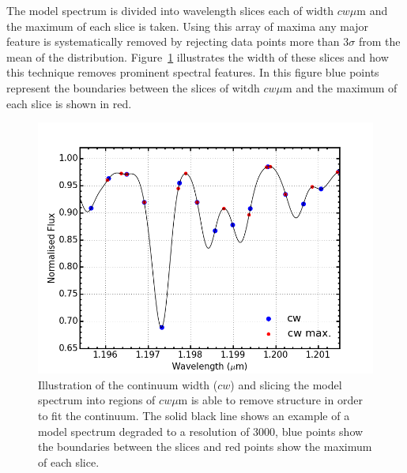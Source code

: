 \documentclass[12pt]{article}
\begin{document}

The model spectrum is divided into wavelength slices each of width $cw\mu$m and the maximum of each slice is taken.
Using this array of maxima any major feature is systematically removed by rejecting data points more than 3$\sigma$ from the mean of the distribution.
Figure~\ref{fig:cw} illustrates the width of these slices and how this technique  removes prominent spectral features.
In this figure blue points represent the boundaries between the slices of witdh $cw\mu$m and the maximum of each slice is shown in red.

\begin{figure}
 \centering
\includegraphics[width=\textwidth]{cw}
\caption[Illustration of continuum width slices and maxima]{
Illustration of the continuum width ($cw$) and slicing the model spectrum into regions of $cw\mu$m is able to remove structure in order to fit the continuum.
The solid black line shows an example of a model spectrum degraded to a resolution of 3000,
blue points show the boundaries between the slices and red points show the maximum of each slice.\label{fig:cw}
         }
\end{figure}
\end{document}
